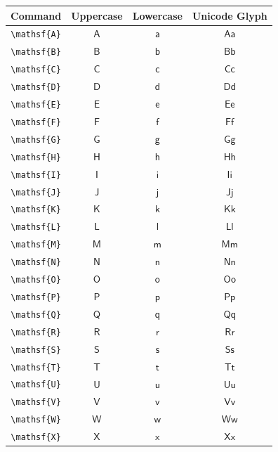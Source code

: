 \documentclass[12pt,a4paper]{article}
\begin{document}
\begin{longtable}{|c|c|c|c|}
\hline
\textbf{Command} & \textbf{Uppercase} & \textbf{Lowercase} & \textbf{Unicode Glyph} \\
\hline
\verb|\mathsf{A}| & $\mathsf{A}$ & $\mathsf{a}$ & $ 𝖠 𝖺 $ \\
\verb|\mathsf{B}| & $\mathsf{B}$ & $\mathsf{b}$ & $ 𝖡 𝖻 $ \\
\verb|\mathsf{C}| & $\mathsf{C}$ & $\mathsf{c}$ & $ 𝖢 𝖼 $ \\
\verb|\mathsf{D}| & $\mathsf{D}$ & $\mathsf{d}$ & $ 𝖣 𝖽 $ \\
\verb|\mathsf{E}| & $\mathsf{E}$ & $\mathsf{e}$ & $ 𝖤 𝖾 $ \\
\verb|\mathsf{F}| & $\mathsf{F}$ & $\mathsf{f}$ & $ 𝖥 𝖿 $ \\
\verb|\mathsf{G}| & $\mathsf{G}$ & $\mathsf{g}$ & $ 𝖦 𝗀 $ \\
\verb|\mathsf{H}| & $\mathsf{H}$ & $\mathsf{h}$ & $ 𝖧 𝗁 $ \\
\verb|\mathsf{I}| & $\mathsf{I}$ & $\mathsf{i}$ & $ 𝖨 𝗂 $ \\
\verb|\mathsf{J}| & $\mathsf{J}$ & $\mathsf{j}$ & $ 𝖩 𝗃 $ \\
\verb|\mathsf{K}| & $\mathsf{K}$ & $\mathsf{k}$ & $ 𝖪 𝗄 $ \\
\verb|\mathsf{L}| & $\mathsf{L}$ & $\mathsf{l}$ & $ 𝖫 𝗅 $ \\
\verb|\mathsf{M}| & $\mathsf{M}$ & $\mathsf{m}$ & $ 𝖬 𝗆 $ \\
\verb|\mathsf{N}| & $\mathsf{N}$ & $\mathsf{n}$ & $ 𝖭 𝗇 $ \\
\verb|\mathsf{O}| & $\mathsf{O}$ & $\mathsf{o}$ & $ 𝖮 𝗈 $ \\
\verb|\mathsf{P}| & $\mathsf{P}$ & $\mathsf{p}$ & $ 𝖯 𝗉 $ \\
\verb|\mathsf{Q}| & $\mathsf{Q}$ & $\mathsf{q}$ & $ 𝖰 𝗊 $ \\
\verb|\mathsf{R}| & $\mathsf{R}$ & $\mathsf{r}$ & $ 𝖱 𝗋 $ \\
\verb|\mathsf{S}| & $\mathsf{S}$ & $\mathsf{s}$ & $ 𝖲 𝗌 $ \\
\verb|\mathsf{T}| & $\mathsf{T}$ & $\mathsf{t}$ & $ 𝖳 𝗍 $ \\
\verb|\mathsf{U}| & $\mathsf{U}$ & $\mathsf{u}$ & $ 𝖴 𝗎 $ \\
\verb|\mathsf{V}| & $\mathsf{V}$ & $\mathsf{v}$ & $ 𝖵 𝗏 $ \\
\verb|\mathsf{W}| & $\mathsf{W}$ & $\mathsf{w}$ & $ 𝖶 𝗐 $ \\
\verb|\mathsf{X}| & $\mathsf{X}$ & $\mathsf{x}$ & $ 𝖷 𝗑 $ \\

\end{longtable}
\end{document}
